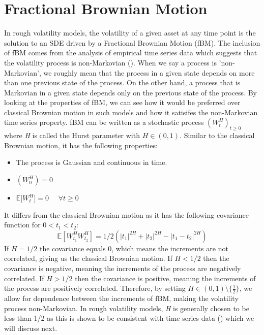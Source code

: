 \documentclass[12pt,oneside]{article}
\begin{document}
\section{Fractional Brownian Motion}
\label{sec:fractionalBm}
In rough volatility models, the volatility of a given asset at any time point is the solution to an SDE driven by a Fractional Brownian Motion (fBM). The inclusion of fBM comes from the analysis of empirical time series data which suggests that the volatility process is non-Markovian (\cite{redGATHERAL}). When we say a process is 'non-Markovian', we roughly mean that the process in a given state depends on more than one previous state of the process. On the other hand, a process that is Markovian in a given state depends only on the previous state of the process. By looking at the properties of fBM, we can see how it would be preferred over classical Brownian motion in such models and how it satisifes the non-Markovian time series property. fBM can be written as a stochastic process $(\textit{$W^H_t$})_{t\ge0}$ where \textit{H} is called the Hurst parameter with $\textit{H} \in (0,1)$. Similar to the classical Brownian motion, it has the following properties: 
\begin{itemize} \item The process is Gaussian and continuous in time. \item $(\textit{$W^H_0$})=0$  \item $\mathbb{E}$[\textit{$W^H_t$}]$=0$ \ \  $\forall t \ge 0$ \end{itemize}
It differs from the classical Brownian motion as it has the following covariance function for $0 < t_1 < t_2$: $$\mathbb{E}[\textit{$W^H_{t_1}$} \textit{$W^H_{t_2}$}] = 1/2 (|t_1|^{2H}+|t_2|^{2H}-|t_1-t_2|^{2H})$$ If $H=1/2$ the covariance equals $0$, which means the increments are not correlated, giving us the classical Brownian motion. If $H<1/2$ then the covariance is negative, meaning the increments of the process are negatively correlated. If $H>1/2$ then the covariance is positive, meaning the increments of the process are positively correlated.  Therefore, by setting $H\in(0,1)\setminus\{\frac{1}{2}\}$, we allow for dependence between the increments of fBM, making the volatility process non-Markovian.  In rough volatility models, \textit{H} is generally chosen to be less than 1/2 as this is shown to be consistent with time series data (\cite{GATHERAL}) which we will discuss next.
\\
\\
\end{document}
